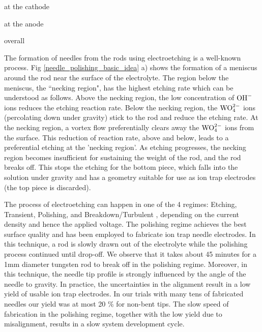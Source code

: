 \documentclass[%
 aip,
 amsmath,amssymb,
 reprint,%
]{revtex4-1}
\begin{document}
 \hspace{0.1\linewidth} at the cathode

 \hspace{0.1\linewidth} at the anode

 \hspace{0.1\linewidth} overall

The formation of needles from the rods using electroetching is a well-known process\cite{STMtips1}. Fig \ref{needle_polishing_basic_idea} a) shows the formation of a meniscus around the rod near the surface of the electrolyte.
The region below the meniscus, the ``necking region",  has the highest etching rate which can be understood as follows.
Above the necking region, the low concentration of $\rm{OH}^-$ ions reduces the etching reaction rate. 
Below the necking region, the $\rm{WO}_4^{2-}$ ions (percolating down under gravity) stick to the rod and reduce the etching rate. 
At the necking region, a vortex flow\cite{DropOffProcessVortex,STMtips2} preferentially clears away the $\rm{WO}_4^{2-}$ ions from the surface. 
This reduction of reaction rate, above and below, leads to a preferential etching at the 'necking region'.
As etching progresses, the necking region becomes insufficient for sustaining the weight of the rod, and the rod breaks off.
This stops the etching for the bottom piece, which falls into the solution under gravity and has a geometry suitable for use as ion trap electrodes (the top piece is discarded).

The process of electroetching can happen in one of the 4 regimes: Etching, Transient, Polishing, and Breakdown/Turbulent \cite{Wang2016}, depending on the current density and hence the applied voltage.
The polishing regime achieves the best surface quality and has been employed\cite{Wang2016} to fabricate ion trap needle electrodes.
In this technique, a rod is slowly drawn out of the electrolyte while the polishing process continued until drop-off.
We observe that it takes about 45 minutes for a 1mm diameter tungsten rod to break off in the polishing regime.
Moreover, in this technique, the needle tip profile is strongly influenced by the angle of the needle to gravity.
In practice, the uncertainties in the alignment result in a low yield of usable ion trap electrodes.
In our trials with many tens of fabricated needles our yield was at most 20 \% for non-bent tips.
The slow speed of fabrication in the polishing regime, together with the low yield due to misalignment, results in a slow system development cycle.
\end{document}

